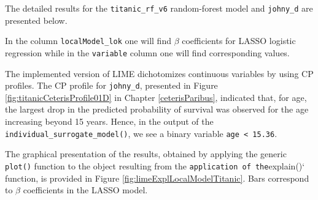 \documentclass[12pt,]{krantz}
\newenvironment{Shaded}{\begin{snugshade}}{\end{snugshade}}
\newcommand{\CommentTok}[1]{\textcolor[rgb]{0.56,0.35,0.01}{\textit{#1}}}
\newcommand{\DataTypeTok}[1]{\textcolor[rgb]{0.13,0.29,0.53}{#1}}
\newcommand{\DecValTok}[1]{\textcolor[rgb]{0.00,0.00,0.81}{#1}}
\newcommand{\KeywordTok}[1]{\textcolor[rgb]{0.13,0.29,0.53}{\textbf{#1}}}
\newcommand{\NormalTok}[1]{#1}
\newcommand{\OperatorTok}[1]{\textcolor[rgb]{0.81,0.36,0.00}{\textbf{#1}}}
\newcommand{\StringTok}[1]{\textcolor[rgb]{0.31,0.60,0.02}{#1}}
\begin{document}
The detailed results for the \texttt{titanic\_rf\_v6} random-forest model and \texttt{johny\_d} are presented below.

\begin{Shaded}
\end{Shaded}

In the column \texttt{localModel\_lok} one will find \(\beta\) coefficients for LASSO logistic regression while in the \texttt{variable} column one will find corresponding values.

The implemented version of LIME dichotomizes continuous variables by using CP profiles. The CP profile for \texttt{johny\_d}, presented in Figure \ref{fig:titanicCeterisProfile01D} in Chapter \ref{ceterisParibus}, indicated that, for age, the largest drop in the predicted probability of survival was observed for the age increasing beyond 15 years. Hence, in the output of the \texttt{individual\_surrogate\_model()}, we see a binary variable \texttt{age\ \textless{}\ 15.36}.

The graphical presentation of the results, obtained by applying the generic \texttt{plot()} function to the object resulting from the \texttt{application\ of\ the}explain()` function, is provided in Figure \ref{fig:limeExplLocalModelTitanic}.
Bars correspond to \(\beta\) coefficients in the LASSO model.
\end{document}
